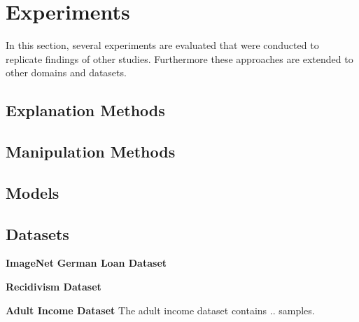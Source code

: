 \section{Experiments}
\label{sec:experiments}
In this section, several experiments are evaluated that were conducted to replicate findings of other studies. Furthermore these approaches are extended to other domains and datasets. 


\subsection{Explanation Methods}

\subsection{Manipulation Methods}

\subsection{Models}

\subsection{Datasets}



\noindent\textbf{ImageNet}
\noindent\textbf{German Loan Dataset}

\noindent\textbf{Recidivism Dataset}

\noindent\textbf{Adult Income Dataset}
The adult income dataset \cite{adult_income} contains .. samples.

